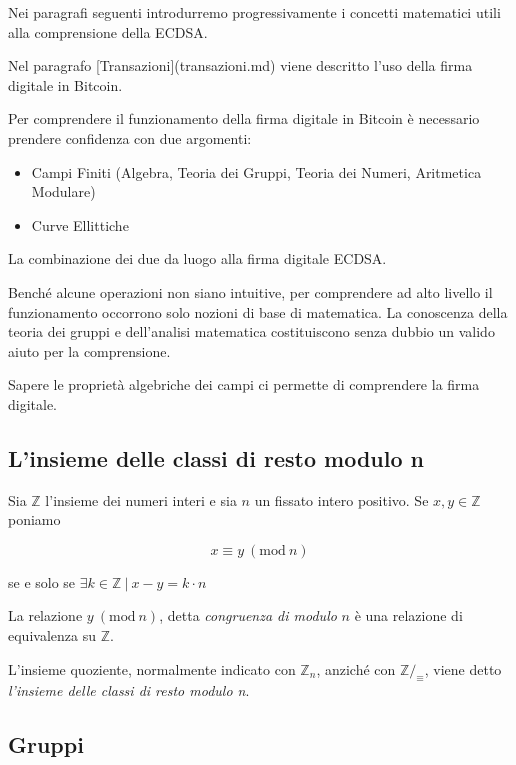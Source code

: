 \documentclass{book}
\theoremstyle{definition}
\newcommand{\Mod}[1]{\ (\mathrm{mod}\ #1)}
\newcommand{\per}{\cdot}
\begin{document}
Nei paragrafi seguenti introdurremo progressivamente i concetti matematici utili alla comprensione della ECDSA.

Nel paragrafo [Transazioni](transazioni.md) viene descritto l'uso della firma digitale in Bitcoin.

Per comprendere il funzionamento della firma digitale in Bitcoin è necessario prendere confidenza con due argomenti:

\begin{itemize}
    \item Campi Finiti (Algebra, Teoria dei Gruppi, Teoria dei Numeri, Aritmetica Modulare)
    \item Curve Ellittiche
\end{itemize}

La combinazione dei due da luogo alla firma digitale ECDSA.

Benché alcune operazioni non siano intuitive, per comprendere ad alto livello il funzionamento occorrono solo nozioni di base di matematica.
La conoscenza della teoria dei gruppi e dell'analisi matematica costituiscono senza dubbio un valido aiuto per la comprensione.

Sapere le proprietà algebriche dei campi ci permette di comprendere la firma digitale.


\newpage
\subsection{L'insieme delle classi di resto modulo n}
Sia $\mathbb{Z}$ l'insieme dei numeri interi e sia $n$ un fissato intero positivo.
Se $x, y \in \mathbb{Z}$ poniamo

\[
x \equiv y \Mod{n}
\]

se e solo se $\exists k \in \mathbb{Z} \ | \ x - y = k \per n$

La relazione $y \Mod{n}$, detta \emph{congruenza di modulo} $n$ è una relazione di equivalenza su $\mathbb{Z}$.

L'insieme quoziente, normalmente indicato con $\mathbb{Z}_{n}$, anziché con $\mathbb{Z}/_{\equiv}$, viene detto \emph{l'insieme delle classi di resto modulo n}.

\subsection{Gruppi}
\end{document}
